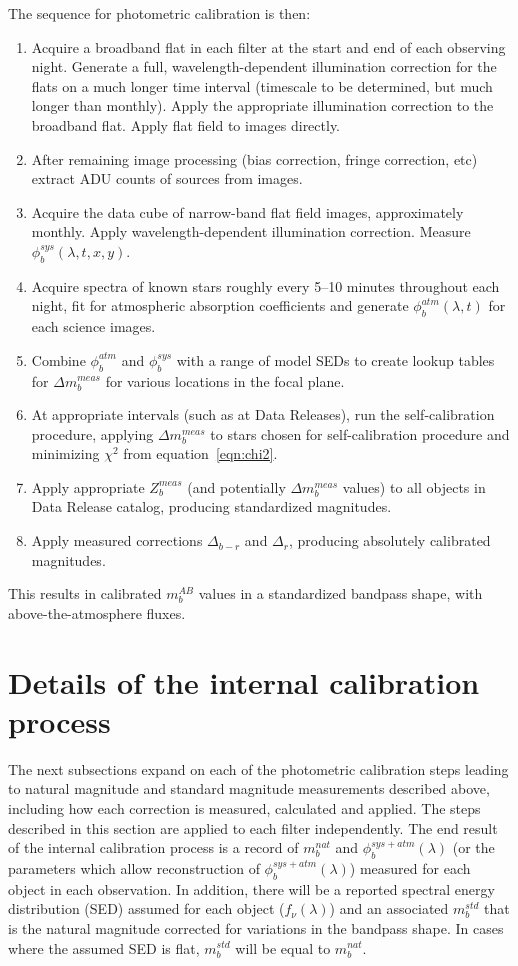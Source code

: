 \documentclass[12pt,preprint]{aastex}
\begin{document}
The sequence for photometric calibration is then:
\begin{enumerate}
\item{Acquire a broadband flat in each filter at the start and end
of each observing night. Generate a full, wavelength-dependent
illumination correction for the flats on a much longer time interval
(timescale to be determined, but much longer than monthly). Apply
the appropriate illumination correction to the broadband flat. Apply
flat field to images directly.}
\item{After remaining image processing (bias correction, fringe
correction, etc) extract ADU counts of sources from images. }
\item{Acquire the data cube of narrow-band flat field images,
approximately monthly. Apply wavelength-dependent illumination
correction. Measure $\phi_b^{sys}(\lambda,t,x,y)$. }
\item{Acquire spectra of known stars roughly every 5--10 minutes
throughout each night, fit for atmospheric absorption coefficients and
generate $\phi_b^{atm}(\lambda,t)$ for each science images. }
\item{Combine $\phi_b^{atm}$ and $\phi_b^{sys}$ with a range of model
SEDs to create lookup tables for $\Delta m_b^{meas}$ for various
locations in the focal plane. }
\item{At appropriate intervals (such as at Data Releases), run the
self-calibration procedure, applying $\Delta m_b^{meas}$ to stars
chosen for self-calibration procedure and minimizing $\chi^2$ from
equation~\ref{eqn:chi2}.}
\item{Apply appropriate $Z_b^{meas}$ (and potentially $\Delta
m_b^{meas}$ values) to all objects in Data Release catalog, producing
standardized magnitudes.}
\item{Apply measured corrections $\Delta_{b-r}$ and $\Delta_r$,
producing absolutely calibrated magnitudes.}
\end{enumerate}
This results in calibrated $m_b^{AB}$ values in a standardized
bandpass shape, with above-the-atmosphere fluxes.

\section{Details of the internal calibration process}
\label{sec:calib_details}

The next subsections expand on each of the photometric calibration
steps leading to natural magnitude and standard magnitude measurements
described above, including how each correction is measured, calculated
and applied.  The steps described in this section are applied to each
filter independently. The end result of the internal calibration
process is a record of $m_b^{nat}$ and $\phi_b^{sys+atm}(\lambda)$ (or
the parameters which allow reconstruction of $\phi_b^{sys+atm}(\lambda)$)
measured for each object in each observation. In addition, there will
be a reported spectral energy distribution (SED) assumed for each
object ($f_\nu(\lambda)$) and an associated $m_b^{std}$ that is the
natural magnitude corrected for variations in the bandpass shape. In
cases where the assumed SED is flat, $m_b^{std}$ will be equal to
$m_b^{nat}$.
 
\end{document}
